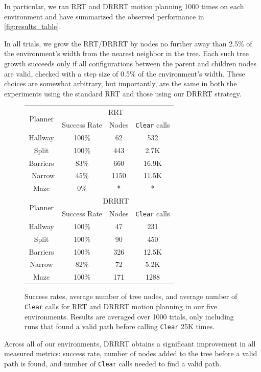 \documentclass[conference]{IEEEtran}
\begin{document}
In particular, we ran RRT and DRRRT motion planning 1000 times on each environment and have summarized the observed performance in \autoref{fig:results_table}.

In all trials, we grow the RRT/DRRRT by nodes no further away than 2.5\% of the environment's width from the nearest neighbor in the tree. Each such tree growth succeeds only if all configurations between the parent and children nodes are valid, checked with a step size of 0.5\% of the environment's width. These choices are somewhat arbitrary, but importantly, are the same in both the experiments using the standard RRT and those using our DRRRT strategy.

\begin{figure}[h]
	\centering
	\begin{tabular}{|c||c|c|c||}
		\hline\multirow{2}{*}{Planner}&\multicolumn{3}{|c||}{RRT}\\
		\cline{2-4}&Success Rate&Nodes&\texttt{Clear} calls\\\hline
		Hallway&100\%&62&532\\
		Split&100\%&443&2.7K\\
		Barriers&83\%&660&16.9K\\\
		Narrow&45\%&1150&11.5K\\
		Maze&0\%&*&*\\\hline\hline
		\multirow{2}{*}{Planner}&\multicolumn{3}{|c||}{DRRRT}\\
		\cline{2-4}&Success Rate&Nodes&\texttt{Clear} calls\\\hline
		Hallway&100\%&47&231\\
		Split&100\%&90&450\\
		Barriers&100\%&326&12.5K\\
		Narrow&82\%&72&5.2K\\
		Maze&100\%&171&1288\\\hline
	\end{tabular}
	\caption{Success rates, average number of tree nodes, and average number of \texttt{Clear} calls for RRT and DRRRT motion planning in our five environments. Results are averaged over 1000 trials, only including runs that found a valid path before calling \texttt{Clear} 25K times.}
	\label{fig:results_table}
\end{figure}

Across all of our environments, DRRRT obtains a significant improvement in all measured metrics: success rate, number of nodes added to the tree before a valid path is found, and number of \texttt{Clear} calls needed to find a valid path.
\end{document}
